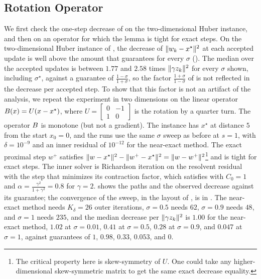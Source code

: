 \documentclass[11pt]{article}
\begin{document}
\subsection{Rotation Operator}\label{sec:numerical-experiments-rotation}
We first check the one-step decrease of  on the two-dimensional Huber instance, and then on an operator for which the lemma is tight for exact steps.
On the two-dimensional Huber instance of , the decrease of $\lVert w_k - x^\star\rVert^2$ at each accepted update is well above the amount that  guarantees for every $\sigma$ ().
The median over the accepted updates is between $1.77$ and $2.58$ times $\lVert\gamma z_k\rVert^2$ for every $\sigma$ shown, including $\sigma^\star$, against a guarantee of $\frac{1-\sigma}{1+\sigma}$, so the factor $\frac{1+\sigma}{1-\sigma}$ of  is not reflected in the decrease per accepted step.
To show that this factor is not an artifact of the analysis, we repeat the experiment in two dimensions on the linear operator ${B}(x) = U(x-x^\star)$, where $U=\begin{bmatrix}
    0 & -1 \\ 1 & 0
\end{bmatrix}$ is the rotation by a quarter turn.
The operator ${B}$ is monotone (but not a gradient).
The instance has $x^\star$ at distance $5$ from the start $x_0 = 0$, and the runs use the same $\sigma$ sweep as before at $s = 1$, with $\delta = 10^{-9}$ and an inner residual of $10^{-12}$ for the near-exact method.
The exact proximal step $w^+$ satisfies $\lVert w - x^\star\rVert^2 - \lVert w^+ - x^\star\rVert^2 = \lVert w - w^+\rVert^2$\footnote{The critical property here is skew-symmetry of $U$.
One could take any higher-dimensional skew-symmetric matrix to get the same exact decrease equality.} and  is tight for exact steps.
The inner solver is Richardson iteration on the resolvent residual with the step that minimizes its contraction factor, which satisfies  with $C_0 = 1$ and $\alpha = \frac{\gamma^2}{1+\gamma^2} = 0.8$ for $\gamma = 2$.
 shows the paths and  the observed decrease against its guarantee; the convergence of the sweep, in the layout of , is  in .
The near-exact method needs $K_\delta = 26$ outer iterations, $\sigma = 0.5$ needs $62$, $\sigma = 0.9$ needs $48$, and $\sigma = 1$ needs $235$, and the median decrease per $\lVert\gamma z_k\rVert^2$ is $1.00$ for the near-exact method, $1.02$ at $\sigma = 0.01$, $0.41$ at $\sigma = 0.5$, $0.28$ at $\sigma = 0.9$, and $0.047$ at $\sigma = 1$, against guarantees of $1$, $0.98$, $0.33$, $0.053$, and $0$.
\end{document}
